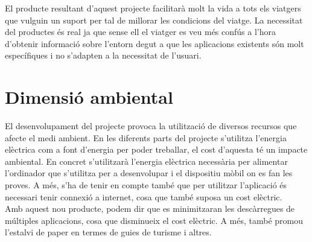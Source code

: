 El producte resultant d’aquest projecte facilitarà molt la vida a tots els viatgers
que vulguin un suport per tal de millorar les condicions del viatge. La necessitat del productes és real ja que sense ell el viatger es veu més confús a l’hora
d’obtenir informació sobre l’entorn degut a que les aplicacions existents són
molt específiques i no s’adapten a la necessitat de l’usuari.

\clearpage
\section{Dimensió ambiental}
El desenvolupament del projecte provoca la utilització de diversos recursos
que afecte el medi ambient. En les diferents parts del projecte s’utilitza l’energia elèctrica com a font d’energia per poder treballar, el cost d’aquesta té un
impacte ambiental. En concret s’utilitzarà l’energia elèctrica necessària per alimentar l’ordinador que s’utilitza per a desenvolupar i el dispositiu mòbil on
es fan les proves. A més, s’ha de tenir en compte també que per utilitzar l’aplicació és necessari tenir connexió a internet, cosa que també suposa un cost
elèctric.\\

Amb aquest nou producte, podem dir que es minimitzaran les descàrregues
de múltiples aplicacions, cosa que disminueix el cost elèctric. A més, també
promou l’estalvi de paper en termes de guies de turisme i altres.
	
